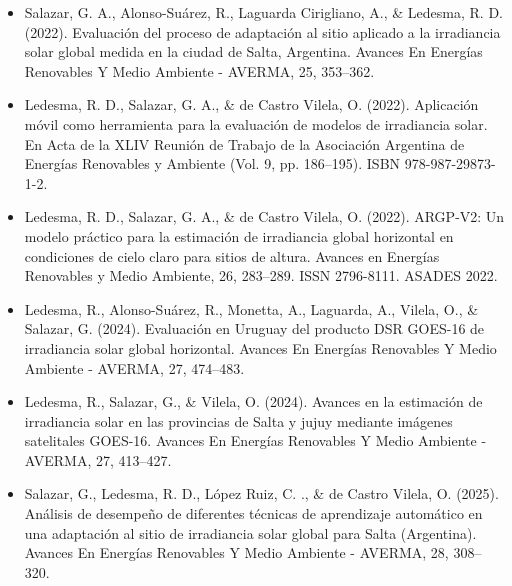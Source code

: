 \documentclass[letterpaper,12pt, twoside]{report}
\providecommand{\DIFdeltex}[1]{{\protect\color{red} \scriptsize #1}} %
\providecommand{\DIFdel}[1]{\texorpdfstring{\DIFdeltex{#1}}{}} %
\begin{document}
\begin{itemize}%
\item%
\DIFdel{Salazar, G. A., Alonso-Suárez, R., Laguarda Cirigliano, A., \& Ledesma, R. D. (2022). Evaluación del proceso de adaptación al sitio aplicado a la irradiancia solar global medida en la ciudad de Salta, Argentina. Avances En Energías Renovables Y Medio Ambiente - AVERMA, 25, 353–362. 
}%
\item%
\DIFdel{Ledesma, R. D., Salazar, G. A., \& de Castro Vilela, O. (2022). Aplicación móvil como herramienta para la evaluación de modelos de irradiancia solar. En Acta de la XLIV Reunión de Trabajo de la Asociación Argentina de Energías Renovables y Ambiente (Vol. 9, pp. 186–195). ISBN 978-987-29873-1-2.
}%

\item%
\DIFdel{Ledesma, R. D., Salazar, G. A., \& de Castro Vilela, O. (2022). ARGP-V2: Un modelo práctico para la estimación de irradiancia global horizontal en condiciones de cielo claro para sitios de altura. Avances en Energías Renovables y Medio Ambiente, 26, 283–289. ISSN 2796-8111. ASADES 2022.
}%

\item%
\DIFdel{Ledesma, R., Alonso-Suárez, R., Monetta, A., Laguarda, A., Vilela, O., \& Salazar, G. (2024). Evaluación en Uruguay del producto DSR GOES-16 de irradiancia solar global horizontal. Avances En Energías Renovables Y Medio Ambiente - AVERMA, 27, 474–483.
}%

\item%
\DIFdel{Ledesma, R., Salazar, G., \& Vilela, O. (2024). Avances en la estimación de irradiancia solar en las provincias de Salta y jujuy mediante imágenes satelitales GOES-16. Avances En Energías Renovables Y Medio Ambiente - AVERMA, 27, 413–427.
}%

\item%
\DIFdel{Salazar, G., Ledesma, R. D., López Ruiz, C. ., \& de Castro Vilela, O. (2025). Análisis de desempeño de diferentes técnicas de aprendizaje automático en una adaptación al sitio de irradiancia solar global para Salta (Argentina). Avances En Energías Renovables Y Medio Ambiente - AVERMA, 28, 308–320.
}%


\end{itemize}
\end{document}
